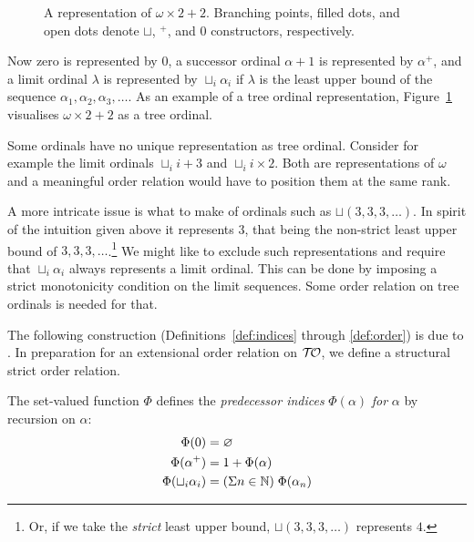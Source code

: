 \begin{figure}
\begin{center}
\begin{tikzpicture}[scale=0.9]

\end{tikzpicture}
\end{center}
\caption{A representation of $\omega \times 2 + 2$. Branching points,
  filled dots, and open dots denote $\sqcup$, $^+$, and $0$
  constructors, respectively.}\label{fig:tree}
\end{figure}

Now zero is represented by $0$, a successor ordinal $\alpha +1$ is represented
by $\alpha^+$, and a limit ordinal $\lambda$ is represented by $\sqcup_i
\alpha_i$ if $\lambda$ is the least upper bound of the sequence $\alpha_1,
\alpha_2, \alpha_3, \ldots$. As an example of a tree ordinal representation,
Figure~\ref{fig:tree} visualises $\omega \times 2 + 2$ as a tree
ordinal.

Some ordinals have no unique representation as tree ordinal. Consider for
example the limit ordinals $\sqcup_i i + 3$ and $\sqcup_i i \times 2$. Both
are representations of $\omega$ and a meaningful order relation would
have to position them at the same rank.

A more intricate issue is what to make of ordinals such as $\sqcup (
3, 3, 3, \ldots )$. In spirit of the intuition given above it
represents $3$, that being the non-strict least upper bound of $3, 3,
3, \ldots$.\footnote{Or, if we take the \emph{strict} least upper bound, $\sqcup (
3, 3, 3, \ldots )$ represents $4$.}
We might like to exclude such representations and require that
$\sqcup_i \alpha_i$ always represents a limit ordinal. This can be
done by imposing a strict monotonicity condition on the limit
sequences. Some order relation on tree ordinals is needed for that.

The following construction (Definitions~\ref{def:indices}
through \ref{def:order}) is due to \citet{hancock-08}. In preparation
for an extensional order relation on $\Ord$, we define a structural
strict order relation.

\begin{definition}\label{def:indices}%
The set-valued function $\Phi$ defines the \emph{predecessor indices}
$\Phi(\alpha)$ \emph{for} $\alpha$ by recursion on $\alpha$:
\begin{align*}
  \Phi(0)                 &= \nothing \\
  \Phi(\alpha^+)          &= 1 + \Phi(\alpha) \\ %
  \Phi(\sqcup_i \alpha_i) &= (\Sigma n \in \mathbb{N}) \; \Phi(\alpha_n)
\end{align*}
\end{definition}

